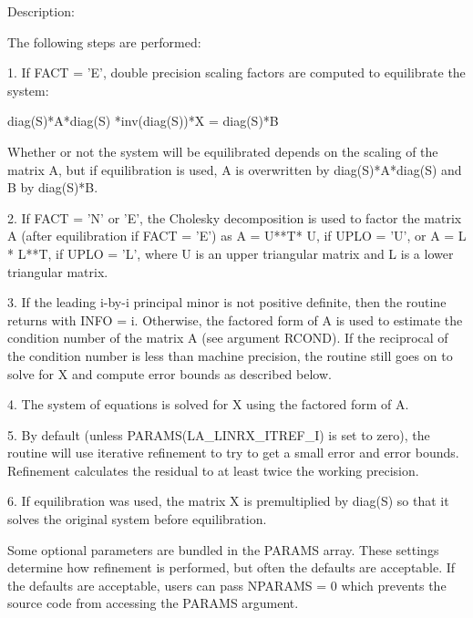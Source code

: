 \begin{DoxyParagraph}{Description\+: }
\begin{DoxyVerb}    The following steps are performed:

    1. If FACT = 'E', double precision scaling factors are computed to equilibrate
    the system:

      diag(S)*A*diag(S)     *inv(diag(S))*X = diag(S)*B

    Whether or not the system will be equilibrated depends on the
    scaling of the matrix A, but if equilibration is used, A is
    overwritten by diag(S)*A*diag(S) and B by diag(S)*B.

    2. If FACT = 'N' or 'E', the Cholesky decomposition is used to
    factor the matrix A (after equilibration if FACT = 'E') as
       A = U**T* U,  if UPLO = 'U', or
       A = L * L**T,  if UPLO = 'L',
    where U is an upper triangular matrix and L is a lower triangular
    matrix.

    3. If the leading i-by-i principal minor is not positive definite,
    then the routine returns with INFO = i. Otherwise, the factored
    form of A is used to estimate the condition number of the matrix
    A (see argument RCOND).  If the reciprocal of the condition number
    is less than machine precision, the routine still goes on to solve
    for X and compute error bounds as described below.

    4. The system of equations is solved for X using the factored form
    of A.

    5. By default (unless PARAMS(LA_LINRX_ITREF_I) is set to zero),
    the routine will use iterative refinement to try to get a small
    error and error bounds.  Refinement calculates the residual to at
    least twice the working precision.

    6. If equilibration was used, the matrix X is premultiplied by
    diag(S) so that it solves the original system before
    equilibration.\end{DoxyVerb}
 \begin{DoxyVerb}     Some optional parameters are bundled in the PARAMS array.  These
     settings determine how refinement is performed, but often the
     defaults are acceptable.  If the defaults are acceptable, users
     can pass NPARAMS = 0 which prevents the source code from accessing
     the PARAMS argument.\end{DoxyVerb}

\end{DoxyParagraph}

